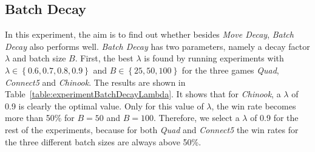 \documentclass[journal]{IEEEtran}
\begin{document}
\subsection{Batch Decay}
In this experiment, the aim is to find out whether besides \textit{Move Decay}, \textit{Batch Decay} also performs well. \textit{Batch Decay} has two parameters, namely a decay factor $\lambda$ and batch size $B$. First, the best $\lambda$ is found by running experiments with $\lambda \in \left\{ {0.6, 0.7, 0.8, 0.9}\right\}$ and $B \in \left\{ {25, 50, 100}\right\}$ for the three games \textit{Quad}, \textit{Connect5} and \textit{Chinook}. The results are shown in Table~\ref{table:experimentBatchDecayLambda}. It shows that for \textit{Chinook}, a $\lambda$ of 0.9 is clearly the optimal value. Only for this value of $\lambda$, the win rate becomes more than 50\% for $B=50$ and $B=100$. Therefore, we select a $\lambda$ of 0.9 for the rest of the experiments, because for both \textit{Quad} and \textit{Connect5} the win rates for the three different batch sizes are always above 50\%. 
\end{document}
